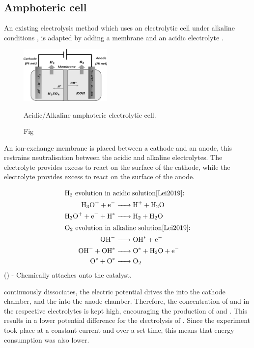 \subsection{Amphoteric cell}%
\label{sub:some_kind_of_splitting_method_}

An existing  electrolysis method which uses an electrolytic cell under alkaline conditions \cite{Zeng2010}, is adapted by adding a membrane and an acidic electrolyte \cite{Lei2019}.

\begin{figure}[H]
	\centering
	\includegraphics[width=0.4\textwidth]{amphoteric_cell.png}
	\caption{Fig}{Acidic/Alkaline amphoteric electrolytic cell\cite{Lei2019}.}
	\label{fig:amphoteric_cell_diagram}
\end{figure}

An ion-exchange membrane is placed between a  cathode and an  anode, this restrains neutralisation between the acidic and alkaline electrolytes.
The  electrolyte provides excess  to react on the surface of the cathode, while the  electrolyte provides excess  to react on the surface of the anode.

\begin{align}
	\intertext{\ce{H2} evolution in acidic solution\cite{Lei2019}:} 
	\ce{H3O+ + e- &-> H+ + H2O}\\
	\ce{H3O+ + e- + H^* &-> H2 + H2O}\\
	\intertext{\ce{O2} evolution in alkaline solution\cite{Lei2019}:}
	\ce{OH- &-> OH^* + e-}\\
	\ce{OH- + OH^* &-> O^* + H2O + e-}\\
	\ce{O^* + O^* &-> O2}
\end{align}
(\ce{^*}) - Chemically attaches onto the catalyst.

 continuously dissociates, the electric potential drives the  into the cathode chamber, and the  into the anode chamber.
Therefore, the concentration of  and  in the respective electrolytes is kept high, encouraging the production of  and .
This results in a lower potential difference for the electrolysis of .
Since the experiment took place at a constant current and over a set time, this means that energy consumption was also lower.

